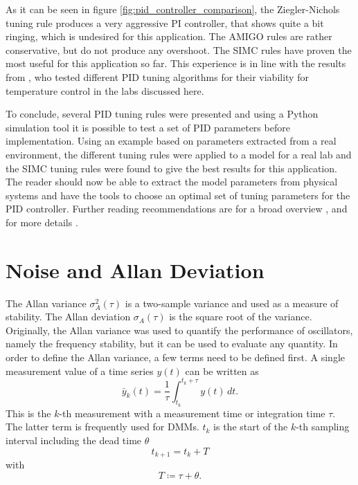 As it can be seen in figure \ref{fig:pid_controller_comparison}, the Ziegler-Nichols tuning rule produces a very aggressive PI controller, that shows quite a bit ringing, which is undesired for this application. The AMIGO rules are rather conservative, but do not produce any overshoot. The SIMC rules have proven the most useful for this application so far. This experience is in line with the results from \citeauthor{thesis_liebmann} \cite{thesis_liebmann}, who tested different PID tuning algorithms for their viability for temperature control in the labs discussed here.

To conclude, several PID tuning rules were presented and using a Python simulation tool it is possible to test a set of PID parameters before implementation. Using an example based on parameters extracted from a real environment, the different tuning rules were applied to a model for a real lab and the SIMC tuning rules were found to give the best results for this application. The reader should now be able to extract the model parameters from physical systems and have the tools to choose an optimal set of tuning parameters for the PID controller. Further reading recommendations are for a broad overview \cite{pid_controller}, and for more details \cite{advanced_pid_control}.

\clearpage
\section{Noise and Allan Deviation}%
\label{sec:allan_deviation}
The Allan variance \cite{adev} $\sigma_A^2(\tau)$ is a two-sample variance and used as a measure of stability. The Allan deviation $\sigma_A(\tau)$ is the square root of the variance. Originally, the Allan variance was used to quantify the performance of oscillators, namely the frequency stability, but it can be used to evaluate any quantity. In order to define the Allan variance, a few terms need to be defined first. A single measurement value of a time series $y(t)$ can be written as
\begin{equation}
    \bar y_k(t) = \frac{1}{\tau} \int_{t_{k}}^{t_{k}+\tau} y(t)\,dt . \label{eqn:allan_variance_measurement}
\end{equation}
This is the $k$-th measurement with a measurement time or integration time $\tau$. The latter term is frequently used for DMMs. $t_k$ is the start of the $k$-th sampling interval including the dead time $\theta$
\begin{equation}
    t_{k+1} = t_k + T
\end{equation}
with
\begin{equation}
    T \coloneqq \tau + \theta .
\end{equation}

